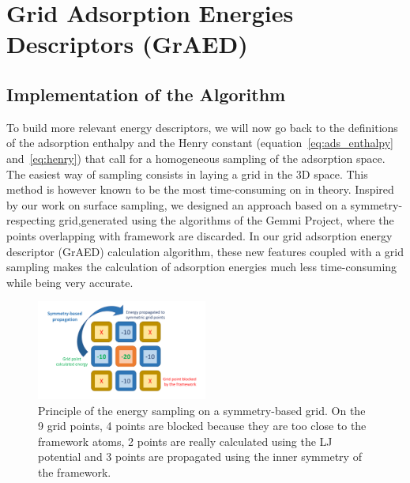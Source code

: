 \documentclass[main]{subfiles}
\begin{document}
\section{Grid Adsorption Energies Descriptors (GrAED)}

\subsection{Implementation of the Algorithm}

To build more relevant energy descriptors, we will now go back to the definitions of the adsorption enthalpy and the Henry constant (equation~\ref{eq:ads_enthalpy} and~\ref{eq:henry}) that call for a homogeneous sampling of the adsorption space. The easiest way of sampling consists in laying a grid in the 3D space. This method is however known to be the most time-consuming on in theory. Inspired by our work on surface sampling, we designed an approach based on a symmetry-respecting grid,generated using the algorithms of the Gemmi Project,\cite{Wojdyr_2022} where the points overlapping with framework are discarded. In our grid adsorption energy descriptor (GrAED) calculation algorithm, these new features coupled with a grid sampling makes the calculation of adsorption energies much less time-consuming while being very accurate.

\begin{figure}[ht]
  \centering
    \includegraphics[width=0.5\textwidth]{figures/3-fastsim/grid_sampling.pdf}
    \caption{Principle of the energy sampling on a symmetry-based grid. On the 9 grid points, 4 points are blocked because they are too close to the framework atoms, 2 points are really calculated using the LJ potential and 3 points are propagated using the inner symmetry of the framework.}\label{fgr:principle_grid}
\end{figure}
\end{document}

